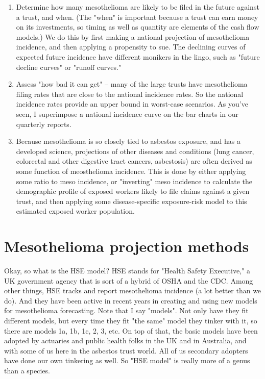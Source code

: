 \documentclass{article}\usepackage{graphicx, color}
\begin{document}
\begin{enumerate}
  \item Determine how many mesothelioma are likely to be filed in the future against a trust, and when.  (The "when" is important because a trust can earn money on its investments, so timing as well as quantity are elements of the cash flow models.)  We do this by first making a national projection of mesothelioma incidence, and then applying a propensity to sue.  The declining curves of expected future incidence have different monikers in the lingo, such as "future decline curves" or "runoff curves."
  \item Assess "how bad it can get" -- many of the large trusts have mesothelioma filing rates that are close to the national incidence rates.  So the national incidence rates provide an upper bound in worst-case scenarios.  As you've seen, I superimpose a national incidence curve on the bar charts in our quarterly reports.
  \item Because mesothelioma is so closely tied to asbestos exposure, and has a developed science, projections of other diseases and conditions (lung cancer, colorectal and other digestive tract cancers, asbestosis) are often derived as some function of meosthelioma incidence.  This is done by either applying some ratio to meso incidence, or "inverting" meso incidence to calculate the demographic profile of exposed workers likely to file claims against a given trust, and then applying some disease-specific exposure-risk model to this estimated exposed worker population. 
\end{enumerate}


\section{Mesothelioma projection methods}

Okay, so what is the HSE model?  HSE stands for "Health Safety Executive," a UK government agency that is sort of a hybrid of OSHA and the CDC.  Among other things, HSE tracks and report mesothelioma incidence (a lot better than we do).  And they have been active in recent years in creating and using new models for mesothelioma forecasting.  Note that I say "models".  Not only have they fit different models, but every time they fit "the same" model they tinker with it, so there are  models 1a, 1b, 1c, 2, 3, etc.  On top of that, the basic models have been adopted by actuaries and public health folks in the UK and in Australia, and with some of us here in the asbestos trust world.  All of us secondary adopters have done our own tinkering as well.  So "HSE model" is really more of a genus than a species.
\end{document}
